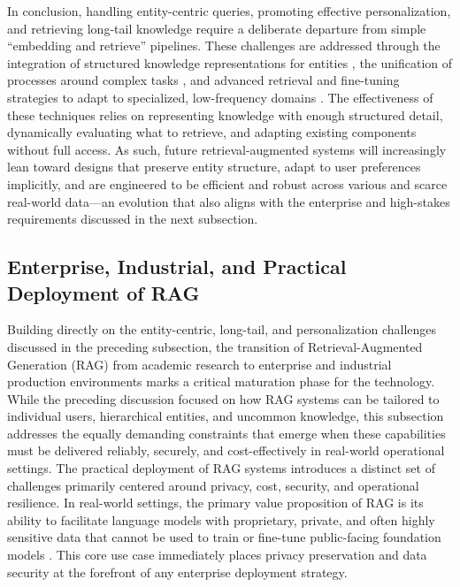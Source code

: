 \documentclass[11pt]{article}
\begin{document}
In conclusion, handling entity-centric queries, promoting effective personalization, and retrieving long-tail knowledge require a deliberate departure from simple ``embedding and retrieve'' pipelines. These challenges are addressed through the integration of structured knowledge representations for entities \cite{ref218}, the unification of processes around complex tasks \cite{ref219}, and advanced retrieval and fine-tuning strategies to adapt to specialized, low-frequency domains \cite{ref77,ref54}. The effectiveness of these techniques relies on representing knowledge with enough structured detail, dynamically evaluating what to retrieve, and adapting existing components without full access. As such, future retrieval-augmented systems will increasingly lean toward designs that preserve entity structure, adapt to user preferences implicitly, and are engineered to be efficient and robust across various and scarce real-world data---an evolution that also aligns with the enterprise and high-stakes requirements discussed in the next subsection.

\subsection{Enterprise, Industrial, and Practical Deployment of RAG}

Building directly on the entity-centric, long-tail, and personalization challenges discussed in the preceding subsection, the transition of Retrieval-Augmented Generation (RAG) from academic research to enterprise and industrial production environments marks a critical maturation phase for the technology. While the preceding discussion focused on how RAG systems can be tailored to individual users, hierarchical entities, and uncommon knowledge, this subsection addresses the equally demanding constraints that emerge when these capabilities must be delivered reliably, securely, and cost-effectively in real-world operational settings. The practical deployment of RAG systems introduces a distinct set of challenges primarily centered around privacy, cost, security, and operational resilience. In real-world settings, the primary value proposition of RAG is its ability to facilitate language models with proprietary, private, and often highly sensitive data that cannot be used to train or fine-tune public-facing foundation models \cite{ref221}. This core use case immediately places privacy preservation and data security at the forefront of any enterprise deployment strategy.
\end{document}
